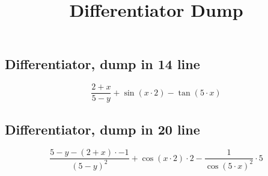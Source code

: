 \documentclass{article}
\title{Differentiator Dump}
\begin{document}
\maketitle

\subsection{Differentiator, dump in 14 line}
\[\frac{{2}+{x}}{{5}-{y}}+\sin\left({x}\cdot{2}\right)-\tan\left({5}\cdot{x}\right)\]

\subsection{Differentiator, dump in 20 line}
\[\frac{{5}-{y}-\left({2}+{x}\right)\cdot{-1}}{\left({5}-{y}\right)^{2}}+\cos\left({x}\cdot{2}\right)\cdot{2}-\frac{{1}}{\cos\left({5}\cdot{x}\right)^{2}}\cdot{5}\]
\end{document}
